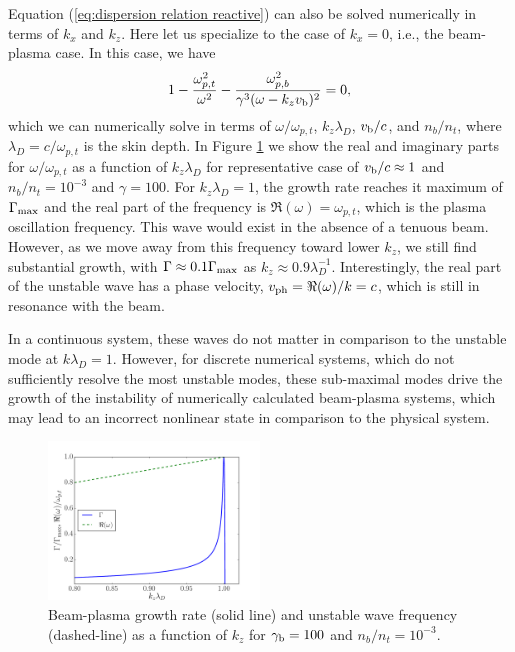 \documentclass[usenatbib,iop,apj,numberedappendix]{aeb_emulateapj_2015}
\newcommand{\gammabeam}{\ensuremath{\gamma_{\rm b}}}
\newcommand{\vbeam}{\ensuremath{v_{\rm b}}}
\begin{document}
Equation (\ref{eq:dispersion relation reactive}) can also be solved numerically in terms of $k_x$ and $k_z$.  Here let us specialize to the case of $k_x = 0$, i.e., the beam-plasma case.  In this case, we have 
\begin{equation}\label{eq:dispersion relation beam-plasma}
 1 - \frac{\omega_{p,t}^2}{\omega^2} - \frac{\omega_{p,b}^2}{\gamma^3(\omega-k_z \vbeam)^2} = 0,
\end{equation}
which we can numerically solve in terms of $\omega/\omega_{p,t}$, $k_z\lambda_D$, $\vbeam/c$, and $n_b/n_t$, where $\lambda_D = c/\omega_{p,t}$ is the skin depth.  In Figure \ref{fig:OffResonance} we show the real and imaginary parts for $\omega/\omega_{p,t}$ as a function of $k_z\lambda_D$ for representative case of $\vbeam/c \approx 1$ and $n_b/n_t = 10^{-3}$ and $\gamma=100$.    For $k_z\lambda_D = 1$, the growth rate reaches it maximum of $\Gamma_{\rm max}$ and the real part of the frequency is $\Re(\omega) = \omega_{p,t}$, which is the plasma oscillation frequency.  This wave would exist in the absence of a tenuous beam.  However, as we move away from this frequency toward lower $k_z$, we still find substantial growth, with $\Gamma \approx 0.1 \Gamma_{\rm max}$ as $k_z \approx 0.9\lambda_D^{-1}$.  Interestingly, the real part of the unstable wave has a phase velocity, $v_{\rm ph} = \Re(\omega)/k = c$, which is still in resonance with the beam.  

In a continuous system, these waves do not matter in comparison to the unstable mode at $k\lambda_D = 1$.   However, for discrete numerical systems, which do not sufficiently resolve the most unstable modes, these sub-maximal modes drive the growth of the instability of numerically calculated beam-plasma systems, which may lead to an incorrect nonlinear state in comparison to the physical system.

\begin{figure}
\includegraphics[width=0.5\textwidth]{off_res.pdf}
\caption{Beam-plasma growth rate (solid line) and unstable wave frequency (dashed-line) as a function of
  $k_z$ for $\gammabeam = 100$ and $n_b/n_t=10^{-3}$. \label{fig:OffResonance}}
\end{figure}
\end{document}
